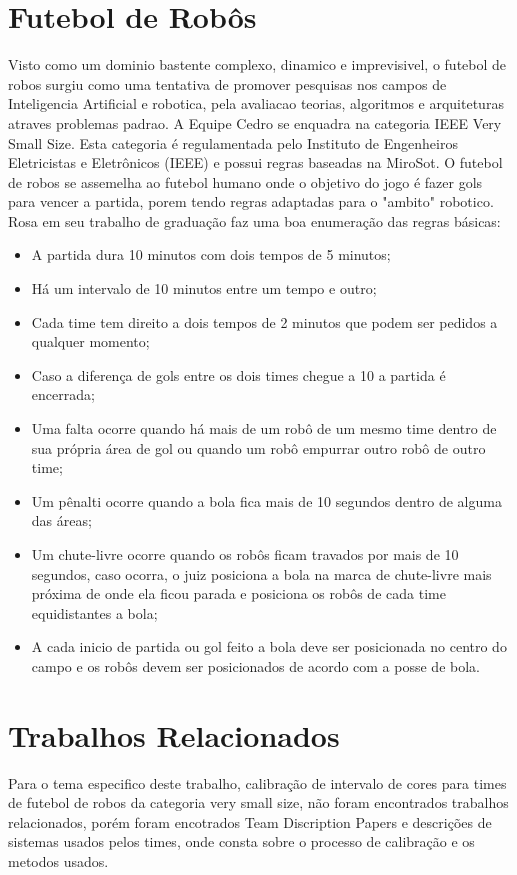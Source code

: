 \section{Futebol de Robôs}
 Visto como um dominio bastente complexo, dinamico e imprevisivel\cite{Costa:2000}, o futebol de robos surgiu como uma tentativa de promover pesquisas nos campos de Inteligencia Artificial e robotica, pela avaliacao teorias, algoritmos e arquiteturas atraves problemas padrao\cite{Kitano:1997}.
 A Equipe Cedro se enquadra na categoria IEEE Very Small Size. Esta categoria é regulamentada pelo Instituto de Engenheiros Eletricistas e Eletrônicos (IEEE) e possui regras baseadas na MiroSot\cite{Rosa:2015}. O futebol de robos se assemelha ao futebol humano onde o objetivo do jogo é fazer gols para vencer a partida, porem tendo regras adaptadas para o "ambito" robotico. 
 Rosa\cite{Rosa:2015} em seu trabalho de graduação faz uma boa enumeração das regras básicas:
 \begin{itemize}
 \item A partida dura 10 minutos com dois tempos de 5 minutos;
  \item Há um intervalo de 10 minutos entre um tempo e outro;
   \item Cada time tem direito a dois tempos de 2 minutos que podem ser pedidos a qualquer
   momento;
    \item Caso a diferença de gols entre os dois times chegue a 10 a partida é encerrada;
     \item Uma falta ocorre quando há mais de um robô de um mesmo time dentro de sua própria
     área de gol ou quando um robô empurrar outro robô de outro time;
     \item Um pênalti ocorre quando a bola fica mais de 10 segundos dentro de alguma das áreas;
     \item Um chute-livre ocorre quando os robôs ficam travados por mais de 10 segundos, caso
     ocorra, o juiz posiciona a bola na marca de chute-livre mais próxima de onde ela ficou
     parada e posiciona os robôs de cada time equidistantes a bola;
     \item A cada inicio de partida ou gol feito a bola deve ser posicionada no centro do campo e os
     robôs devem ser posicionados de acordo com a posse de bola.
 \end{itemize}
\section{Trabalhos Relacionados}
Para o tema especifico deste trabalho, calibração de intervalo de cores para times de futebol de robos da categoria very small size, não foram encontrados trabalhos relacionados, porém foram encotrados Team Discription Papers e descrições de sistemas usados pelos times, onde consta sobre o processo de calibração e os metodos usados.

